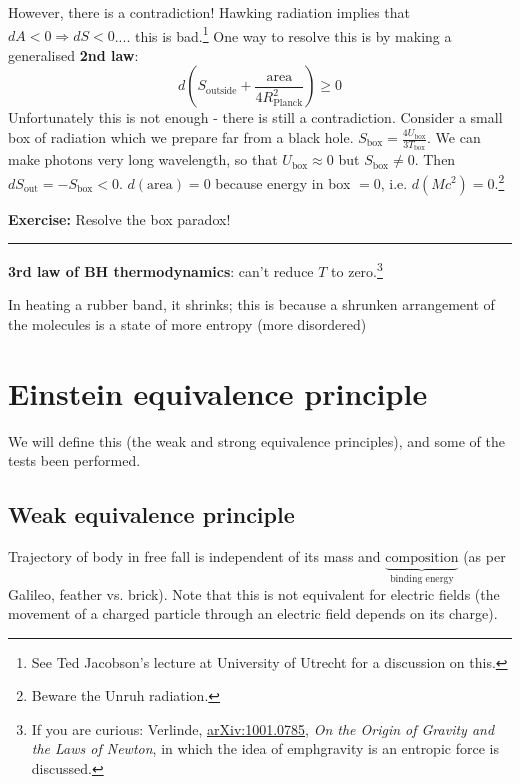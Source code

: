 \documentclass[a4paper]{article} %
\newcommand{\exercise}[2]
{
\begin{framed}
\textbf{Exercise:} #1 \\\hrule
#2
\end{framed}
}
\begin{document}
However, there is a contradiction! Hawking radiation implies that $dA<0 \Rightarrow dS<0$.... this is bad.\footnote{See Ted Jacobson's lecture at University of Utrecht for a discussion on this.} One way to resolve this is by making a generalised \textbf{2nd law}:
\begin{equation}
d\left(S_{\text{outside}}+\frac{\text{area}}{4R_{\text{Planck}}^2}\right)\geq 0
\end{equation}
Unfortunately this is not enough - there is still a contradiction. Consider a small box of radiation which we prepare far from a black hole. $S_{\text{box}}=\frac{4U_{\text{box}}}{3T_\text{box}}$. We can make photons very long wavelength, so that $U_{\text{box}}\approx 0$ but $S_{\text{box}}\neq 0$. Then $dS_{\text{out}}=-S_{\text{box}}<0$. $d(\text{area})=0$ because energy in box $=0$, i.e. $d(Mc^2)=0$.\footnote{Beware the Unruh radiation.}

\exercise{Resolve the box paradox!}{}

\textbf{3rd law of BH thermodynamics}: can't reduce $T$ to zero.\footnote{If you are curious: Verlinde, 
\href{arXiv.org/abs/1001.0785}{arXiv:1001.0785}, \emph{On the Origin of Gravity and the Laws of Newton}, in which the idea of emph{gravity is an entropic force} is discussed.}

In heating a rubber band, it shrinks; this is because a shrunken arrangement of the molecules is a state of more entropy (more disordered)

\begin{center}
{
}
\end{center}

																					
\section{Einstein equivalence principle}
We will define this (the weak and strong equivalence principles), and some of the tests been performed.

\subsection{Weak equivalence principle}
Trajectory of body in free fall is independent of its mass and $\underbrace{\text{composition}}_{\text{binding energy}}$ (as per Galileo, feather vs. brick). Note that this is not equivalent for electric fields (the movement of a charged particle through an electric field depends on its charge).
\end{document}

